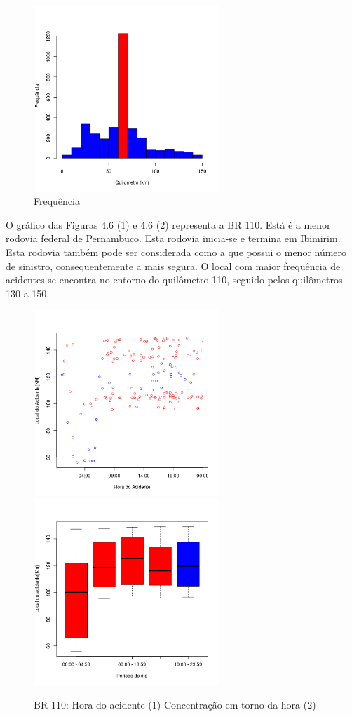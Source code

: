 \quad \quad
\begin{figure}[h]
	\centering
	\caption{ Frequência}
	\includegraphics[width=7cm,height=7cm]{Figuras/Preprocess/br104_3.png}
\end{figure}

\pagebreak

O gráfico das Figuras 4.6 (1) e 4.6 (2) representa a BR 110. Está é a menor rodovia federal de Pernambuco. Esta rodovia inicia-se e termina em Ibimirim. Esta rodovia também pode ser considerada como a que possui o menor número de sinistro, consequentemente a mais segura. O local com maior frequência de acidentes se encontra no entorno do quilômetro 110, seguido pelos quilômetros 130 a 150.

\begin{figure}[h]
	\caption{BR 110: Hora do acidente (1)  Concentração em torno da hora (2)}
	\includegraphics[width=7cm,height=7cm]{Figuras/Preprocess/br110_1.png}
	\includegraphics[width=7cm,height=7cm]{Figuras/Preprocess/br110_2.png}

\end{figure}


